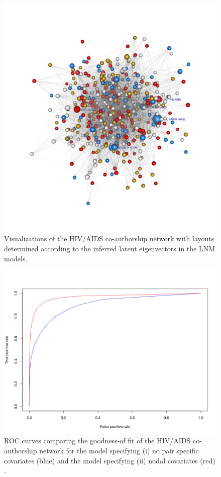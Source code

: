 \begin{figure}[!h]
\includegraphics[scale=0.18,trim={5cm 5cm 5cm 5cm}]{Chapters/hiv/statMod/lnm_mod7_allAttributes.png}
\caption{Visualizations of the HIV/AIDS co-authorship network with layouts determined according to the inferred latent eigenvectors in the LNM models.
}
\label{fig:hiv_lnm_viz}
\end{figure}

\begin{figure}[!h]
\centering
\includegraphics[scale=0.5]{Chapters/hiv/statMod/lnm_ROC_nullVSallNodal.png}
\caption{ROC curves comparing the goodness-of fit of the HIV/AIDS co-authorship network for the model specifying (i) no pair specific covariates (blue) and the model specifying (ii) nodal covariates (red)%
.}
\label{fig:hiv_lnm_roc}
\end{figure}

